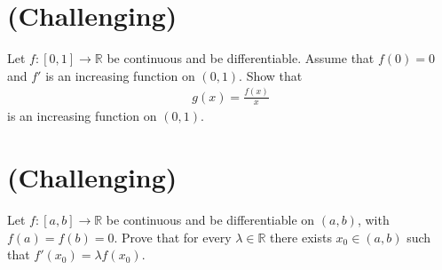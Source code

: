 \documentclass[11pt,letterpaper]{article}
\begin{document}
\section{(Challenging)}
Let $f:[0,1]\to\mathbb{R}$ be continuous and be differentiable. Assume that $f(0) = 0$ and $f'$ is an increasing function on $(0,1)$. Show that
\begin{align}
    g(x)=\frac{f(x)}{x}
\end{align}
is an increasing function on $(0,1)$.

\section{(Challenging)}
Let $f:[a,b]\to\mathbb{R}$ be continuous and be differentiable on $(a,b)$, with $f(a) = f(b) = 0$. Prove that for every $\lambda\in\mathbb{R}$ there exists $x_0\in(a,b)$ such that $f'(x_0)=\lambda f(x_0)$.


\vfill
\printbibliography
\end{document}
